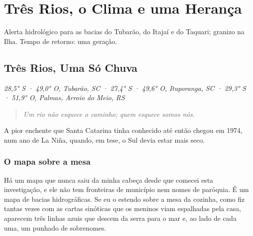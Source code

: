 \documentclass[
  brazilian,
  11pt,
  openany]{book}
\newenvironment{boletim}{\begin{center}\begin{minipage}{0.85\linewidth}\small\itshape}{\end{minipage}\end{center}}
\begin{document}
\part{Três Rios, o Clima e uma
Herança}\label{truxeas-rios-o-clima-e-uma-heranuxe7a}

\begin{boletim}

Alerta hidrológico para as bacias do Tubarão, do Itajaí e do Taquari;
granizo na Ilha. Tempo de retorno: uma geração.

\end{boletim}

\chapter{Três Rios, Uma Só Chuva}\label{cap-13}

\emph{28,5° S · 49,0° O, Tubarão, SC · 27,4° S · 49,6° O, Ituporanga, SC
· 29,3° S · 51,9° O, Palmas, Arroio do Meio, RS}

\begin{quote}
\emph{Um rio não esquece o caminho; quem esquece somos nós.}
\end{quote}

A pior enchente que Santa Catarina tinha conhecido até então chegou em
1974, num ano de La Niña, quando, em tese, o Sul devia estar mais seco.

\section{O mapa sobre a mesa}\label{o-mapa-sobre-a-mesa}

Há um mapa que nunca saiu da minha cabeça desde que comecei esta
investigação, e ele não tem fronteiras de município nem nomes de
paróquia. É um mapa de bacias hidrográficas. Se eu o estendo sobre a
mesa da cozinha, como fiz tantas vezes com as cartas sinóticas que os
meninos viam espalhadas pela casa, aparecem três linhas azuis que descem
da serra para o mar e, ao lado de cada uma, um punhado de sobrenomes.
\end{document}
